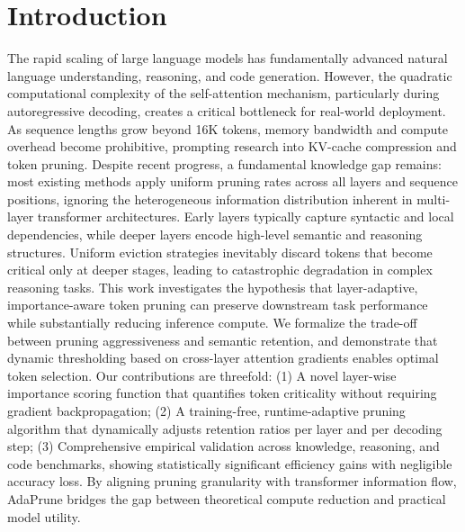 \documentclass[11pt,a4paper]{article}
\begin{document}
\section{Introduction}
The rapid scaling of large language models has fundamentally advanced natural language understanding, reasoning, and code generation. However, the quadratic computational complexity of the self-attention mechanism, particularly during autoregressive decoding, creates a critical bottleneck for real-world deployment. As sequence lengths grow beyond 16K tokens, memory bandwidth and compute overhead become prohibitive, prompting research into KV-cache compression and token pruning. Despite recent progress, a fundamental knowledge gap remains: most existing methods apply uniform pruning rates across all layers and sequence positions, ignoring the heterogeneous information distribution inherent in multi-layer transformer architectures. Early layers typically capture syntactic and local dependencies, while deeper layers encode high-level semantic and reasoning structures. Uniform eviction strategies inevitably discard tokens that become critical only at deeper stages, leading to catastrophic degradation in complex reasoning tasks. This work investigates the hypothesis that layer-adaptive, importance-aware token pruning can preserve downstream task performance while substantially reducing inference compute. We formalize the trade-off between pruning aggressiveness and semantic retention, and demonstrate that dynamic thresholding based on cross-layer attention gradients enables optimal token selection. Our contributions are threefold: (1) A novel layer-wise importance scoring function that quantifies token criticality without requiring gradient backpropagation; (2) A training-free, runtime-adaptive pruning algorithm that dynamically adjusts retention ratios per layer and per decoding step; (3) Comprehensive empirical validation across knowledge, reasoning, and code benchmarks, showing statistically significant efficiency gains with negligible accuracy loss. By aligning pruning granularity with transformer information flow, AdaPrune bridges the gap between theoretical compute reduction and practical model utility.
\end{document}
